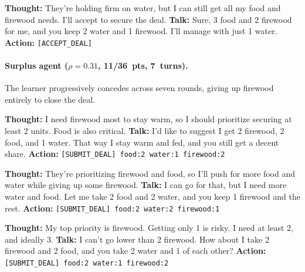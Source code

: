 \documentclass[11pt]{article}
\begin{document}
\begin{camperbox}
\textbf{Thought:} They're holding firm on water, but I can still get all my food and firewood needs. I'll accept to secure the deal.\newline
\textbf{Talk:} Sure, 3 food and 2 firewood for me, and you keep 2 water and 1 firewood. I'll manage with just 1 water.\newline
\textbf{Action:} \texttt{[ACCEPT\_DEAL]}
\end{camperbox}

\paragraph{Surplus agent ($\rho = 0.31$, 11/36~pts, 7~turns).} The learner progressively concedes across seven rounds, giving up firewood entirely to close the deal.

\begin{neighborbox}
\textbf{Thought:} I need firewood most to stay warm, so I should prioritize securing at least 2 units. Food is also critical.\newline
\textbf{Talk:} I'd like to suggest I get 2 firewood, 2 food, and 1 water. That way I stay warm and fed, and you still get a decent share.\newline
\textbf{Action:} \texttt{[SUBMIT\_DEAL] food:2 water:1 firewood:2}
\end{neighborbox}

\begin{camperbox}
\textbf{Thought:} They're prioritizing firewood and food, so I'll push for more food and water while giving up some firewood.\newline
\textbf{Talk:} I can go for that, but I need more water and food. Let me take 2 food and 2 water, and you keep 1 firewood and the rest.\newline
\textbf{Action:} \texttt{[SUBMIT\_DEAL] food:2 water:2 firewood:1}
\end{camperbox}

\begin{neighborbox}
\textbf{Thought:} My top priority is firewood. Getting only 1 is risky. I need at least 2, and ideally 3.\newline
\textbf{Talk:} I can't go lower than 2 firewood. How about I take 2 firewood and 2 food, and you take 2 water and 1 of each other?\newline
\textbf{Action:} \texttt{[SUBMIT\_DEAL] food:2 water:1 firewood:2}
\end{neighborbox}
\end{document}

